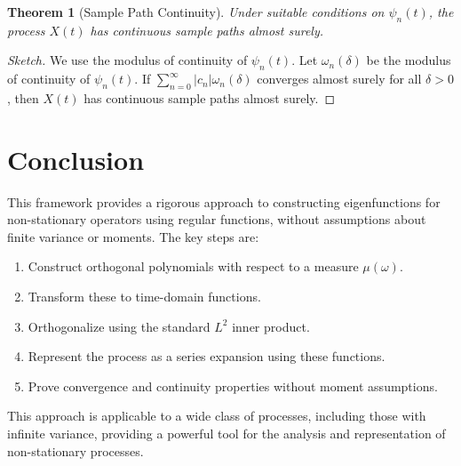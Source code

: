 \documentclass{article}
\newtheorem{theorem}{Theorem}
\begin{document}
\begin{theorem}[Sample Path Continuity]
Under suitable conditions on $\psi_n(t)$, the process $X(t)$ has continuous sample paths almost surely.
\end{theorem}

\begin{proof}[Sketch]
We use the modulus of continuity of $\psi_n(t)$. Let $\omega_n(\delta)$ be the modulus of continuity of $\psi_n(t)$. If $\sum_{n=0}^{\infty} |c_n| \omega_n(\delta)$ converges almost surely for all $\delta > 0$, then $X(t)$ has continuous sample paths almost surely.
\end{proof}

\section{Conclusion}

This framework provides a rigorous approach to constructing eigenfunctions for non-stationary operators using regular functions, without assumptions about finite variance or moments. The key steps are:

\begin{enumerate}
\item Construct orthogonal polynomials with respect to a measure $\mu(\omega)$.
\item Transform these to time-domain functions.
\item Orthogonalize using the standard $L^2$ inner product.
\item Represent the process as a series expansion using these functions.
\item Prove convergence and continuity properties without moment assumptions.
\end{enumerate}

This approach is applicable to a wide class of processes, including those with infinite variance, providing a powerful tool for the analysis and representation of non-stationary processes.
\end{document}
